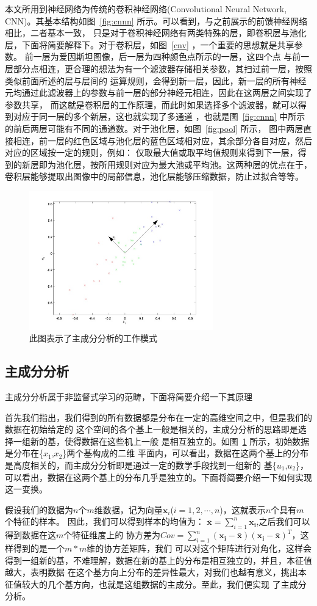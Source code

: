 \documentclass[aps,pre,12pt,preprint,onecolumn,showpacs,showkeys]{revtex4-1}
\begin{document}
本文所用到神经网络为传统的卷积神经网络(Convolutional Neural 
Network, CNN)。其基本结构如图~\ref{fig:cnnn} 所示。可以看到，与之前展示的前馈神经网络相比，二者基本一致，
只是对于卷积神经网络有两类特殊的层，即卷积层与池化层，下面将简要解释下。对于卷积层，如图~\ref{cnv} ，一个重要的思想就是共享参数。
前一层为爱因斯坦图像，后一层为四种颜色点所示的一层，这四个点
与前一层部分点相连，更合理的想法为有一个滤波器存储相关参数，其扫过前一层，按照类似前面所述的层与层间的
运算规则，会得到新一层，因此，新一层的所有神经元均通过此滤波器上的参数与前一层的部分神经元相连，因此在这两层之间实现了参数共享，
而这就是卷积层的工作原理，而此时如果选择多个滤波器，就可以得到对应于同一层的多个新层，这也就实现了多通道
，也就是图~\ref{fig:cnnn} 中所示的前后两层可能有不同的通道数。对于池化层，如图~\ref{fig:pool} 所示，
图中两层直接相连，前一层的红色区域与池化层的蓝色区域相对应，其余部分各自对应，然后对应的区域按一定的规则，例如：
仅取最大值或取平均值规则来得到下一层，得到的新层即为池化层，按所用规则对应为最大池或平均池。这两种层的优点在于，
卷积层能够提取出图像中的局部信息，池化层能够压缩数据，防止过拟合等等。
\begin{figure}[t]
\centering
\includegraphics[width=80mm]{pca}
\caption{\label{fig:pca}%
此图表示了主成分分析的工作模式}
\end{figure}

\subsection{主成分分析}
主成分分析属于非监督式学习的范畴，下面将简要介绍一下其原理\par
首先我们指出，我们得到的所有数据都是分布在一定的高维空间之中，但是我们的数据在初始给定的
这个空间的各个基上一般是相关的，主成分分析的思路即是选择一组新的基，使得数据在这些机上一般
是相互独立的。如图~\ref{fig:pca} 所示，初始数据是分布在\{$x_{1}$,$x_{2}$\}两个基构成的二维
平面内，可以看出，数据在这两个基上的分布是高度相关的，而主成分分析即是通过一定的数学手段找到一组新的
基\{$u_{1}$,$u_{2}$\}，可以看出，数据在这两个基上的分布几乎是独立的。下面将简要介绍一下如何实现这一变换。\par
假设我们的数据为$n$个$m$维数据，记为向量$\bm x_{i}$($i=1,2,\cdots,n$)，这就表示$n$个具有$m$个特征的样本。
因此，我们可以得到样本的均值为：
$\bm{\bar{x}}=\sum_{i=1}^{n}\bm{x_{i}}$,之后我们可以得到数据在这$m$个特征维度上的
协方差为$Cov=\sum_{i=1}^{n}\bm{(x_{i}-\bar{x})(x_{i}-\bar{x})}^{T}$，这样得到的是一个$m*m$维的协方差矩阵，我们
可以对这个矩阵进行对角化，这样会得到一组新的基，不难理解，数据在新的基上的分布是相互独立的，并且，本征值越大，表明数据
在这个基方向上分布的差异性最大，对我们也越有意义，挑出本征值较大的几个基方向，也就是这组数据的主成分。至此，我们便实现
了主成分分析。
\end{document}

